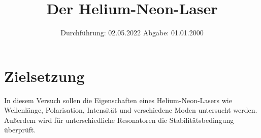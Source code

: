 
\usepackage{lipsum}
\def\TEM#1{$\text{TEM}_{#1}$}

\subject{V61}
\title{Der Helium-Neon-Laser}
\date{
    Durchführung: 02.05.2022
     \hspace{3em}
    Abgabe: 01.01.2000
}


\maketitle
\thispagestyle{empty}
\tableofcontents
\newpage

\section{Zielsetzung}

    In diesem Versuch sollen die Eigenschaften eines Helium-Neon-Lasers wie Wellenlänge, Polarisation, Intensität und verschiedene Moden untersucht werden.
    Außerdem wird für unterschiedliche Resonatoren die Stabilitätsbedingung überprüft.


\clearpage


\clearpage


\clearpage


\clearpage

\printbibliography



